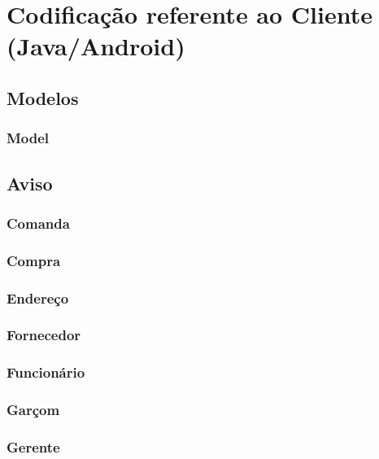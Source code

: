\section{Codificação referente ao Cliente (Java/Android)}

\subsection{Modelos}

\subsubsection{Model}

\subsection{Aviso}

\subsubsection{Comanda}

\subsubsection{Compra}

\subsubsection{Endereço}

\subsubsection{Fornecedor}

\subsubsection{Funcionário}

\subsubsection{Garçom}

\subsubsection{Gerente}

